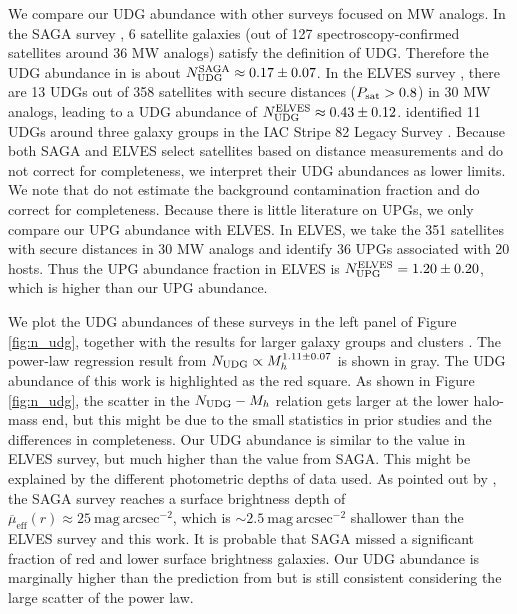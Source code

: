 \documentclass[twocolumn,astrosymb,twocolappendix]{aastex631}
\newcommand{\sbunit}{\mathrm{mag\ arcsec}^{-2}}
\newcommand{\sbeffr}{\overline{\mu}_{\mathrm{eff}}(r)}
\begin{document}
\begin{CJK*}{UTF8}{gbsn}
We compare our UDG abundance with other surveys focused on MW analogs. In the SAGA survey \citep{SAGA-II}, 6 satellite galaxies (out of 127 spectroscopy-confirmed satellites around 36 MW analogs) satisfy the definition of UDG. Therefore the UDG abundance in \citet{SAGA-II} is about $N_{\rm UDG}^{\rm SAGA}\approx 0.17\pm0.07$. In the ELVES survey \citep{CarlstenELVES2022}, there are 13 UDGs out of 358 satellites with secure distances ($P_{\rm sat} > 0.8$) in 30 MW analogs, leading to a UDG abundance of $N_{\rm UDG}^{\rm ELVES} \approx 0.43\pm0.12$. \citet{Roman2017b} identified 11 UDGs around three galaxy groups in the IAC Stripe 82 Legacy Survey \citep{Fliri2016}. Because both SAGA and ELVES select satellites based on distance measurements and do not correct for completeness, we interpret their UDG abundances as lower limits. We note that \citet{Roman2017b} do not estimate the background contamination fraction and do correct for completeness. Because there is little literature on UPGs, we only compare our UPG abundance with ELVES. In ELVES, we take the 351 satellites with secure distances in 30 MW analogs and identify 36 UPGs associated with 20 hosts. Thus the UPG abundance fraction in ELVES is $N_{\rm UPG}^{\rm ELVES} = 1.20 \pm 0.20$, which is higher than our UPG abundance. 


We plot the UDG abundances of these surveys in the left panel of Figure \ref{fig:n_udg}, together with the results for larger galaxy groups and clusters \citep{Koda2015,Munoz2015,Roman2017a,Roman2017b,Janssens2017,vdBurg2017}. 
The power-law regression result from \citet{vdBurg2017} $N_{\rm UDG} \propto M_h^{1.11\pm 0.07}$ is shown in gray. The UDG abundance of this work is highlighted as the red square. As shown in Figure \ref{fig:n_udg}, the scatter in the $N_{\rm UDG}-M_h$ relation gets larger at the lower halo-mass end, but this might be due to the small statistics in prior studies and the differences in completeness. Our UDG abundance is similar to the value in ELVES survey, but much higher than the value from SAGA. This might be explained by the different photometric depths of data used. As pointed out by \citet{CarlstenELVES2022,Font2022}, the SAGA survey reaches a surface brightness depth of $\sbeffr\approx 25\ \sbunit$, which is $\sim 2.5\ \sbunit$ shallower than the ELVES survey and this work. It is probable that SAGA missed a significant fraction of red and lower surface brightness galaxies. Our UDG abundance is marginally higher than the prediction from \citet{vdBurg2017} but is still consistent considering the large scatter of the power law. 


\end{CJK*}
\end{document}
